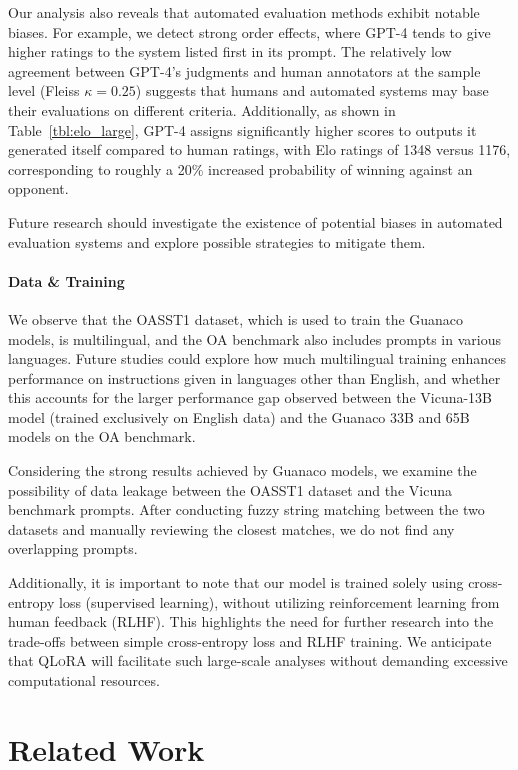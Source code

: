 Our analysis also reveals that automated evaluation methods exhibit notable biases. For example, we detect strong order effects, where GPT-4 tends to give higher ratings to the system listed first in its prompt. The relatively low agreement between GPT-4’s judgments and human annotators at the sample level (Fleiss $\kappa=0.25$) suggests that humans and automated systems may base their evaluations on different criteria. Additionally, as shown in Table~\ref{tbl:elo_large}, GPT-4 assigns significantly higher scores to outputs it generated itself compared to human ratings, with Elo ratings of 1348 versus 1176, corresponding to roughly a 20\% increased probability of winning against an opponent.

Future research should investigate the existence of potential biases in automated evaluation systems and explore possible strategies to mitigate them.

\paragraph{Data \& Training} We observe that the OASST1 dataset, which is used to train the {Guanaco} models, is multilingual, and the OA benchmark also includes prompts in various languages. Future studies could explore how much multilingual training enhances performance on instructions given in languages other than English, and whether this accounts for the larger performance gap observed between the Vicuna-13B model (trained exclusively on English data) and the {Guanaco} 33B and 65B models on the OA benchmark.

Considering the strong results achieved by {Guanaco} models, we examine the possibility of data leakage between the OASST1 dataset and the Vicuna benchmark prompts. After conducting fuzzy string matching between the two datasets and manually reviewing the closest matches, we do not find any overlapping prompts.

Additionally, it is important to note that our model is trained solely using cross-entropy loss (supervised learning), without utilizing reinforcement learning from human feedback (RLHF). This highlights the need for further research into the trade-offs between simple cross-entropy loss and RLHF training. We anticipate that \textsc{QLoRA} will facilitate such large-scale analyses without demanding excessive computational resources.

\section{Related Work}

